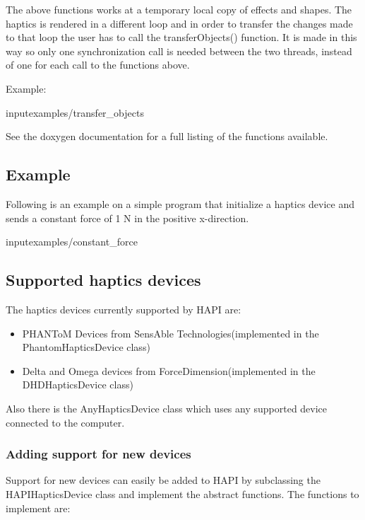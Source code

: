 The above functions works at a temporary local copy of effects and
shapes. The haptics is rendered in a different loop and in order to
transfer the changes made to that loop the user has to call the
transferObjects() function. It is made in this way so only one
synchronization call is needed between the two threads, instead of one
for each call to the functions above.

Example:

input{examples/transfer_objects}

See the doxygen documentation for a full listing of the functions
available. 

\subsection{Example}
Following is an example on a simple program that initialize a haptics
device and sends a constant force of 1 N in the positive x-direction.

input{examples/constant_force} 

\subsection{Supported haptics devices}
The haptics devices currently supported by HAPI are:

\begin{itemize}
\item PHANToM Devices from SensAble Technologies(implemented in the
  PhantomHapticsDevice class)
\item Delta and Omega devices from ForceDimension(implemented in the
  DHDHapticsDevice class)
\end{itemize}

Also there is the AnyHapticsDevice class which uses any supported
device connected to the computer.

\subsubsection{Adding support for new devices}

Support for new devices can easily be added to HAPI by subclassing the
HAPIHapticsDevice class and implement the abstract functions. The
functions to implement are:

